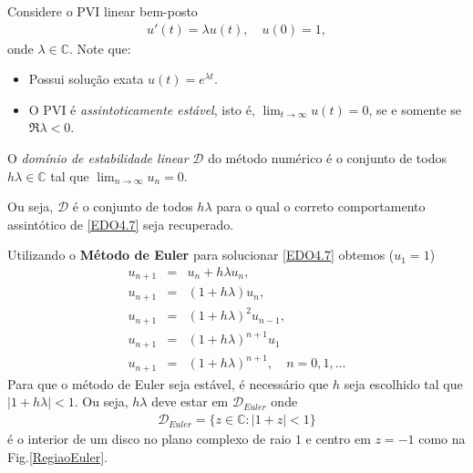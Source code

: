 Considere o PVI linear bem-posto
\begin{eqnarray}\label{EDO4.7}
  u'(t)= \lambda u(t), \quad  u(0)=1,
\end{eqnarray}
onde $\lambda  \in  \mathbb{C}$. Note que:
\begin{itemize}
\item Possui solução exata $u(t)=e^{\lambda t}.$
\item O PVI é \emph{assintoticamente estável}, isto é, $\lim_{t\rightarrow \infty }u(t)=0$, se e somente se $\Re{\lambda }<0$.
\
\end{itemize}




\begin{defn}
O \emph{domínio de estabilidade linear} $\mathcal D$ do método numérico é o conjunto de todos $h\lambda  \in  \mathbb{C}$ tal que $\lim_{n\rightarrow \infty }u_n=0$.
\end{defn}

Ou seja, $\mathcal D$ é o conjunto de todos $h\lambda $ para o qual o correto comportamento assintótico de \eqref{EDO4.7} seja recuperado.



\begin{ex}
Utilizando o \textbf{Método de Euler} para solucionar \eqref{EDO4.7} obtemos ($u_1=1$)
\begin{eqnarray}
 u_{n+1}   & =& u_n+h\lambda u_n, \\
 u_{n+1}   & =& (1+h\lambda )u_n, \\
 u_{n+1}   & =& (1+h\lambda )^2u_{n-1}, \\
 u_{n+1}   & =& (1+h\lambda )^{n+1}u_1 \\
 u_{n+1}   & =& (1+h\lambda )^{n+1}  , \quad  n=0,1,\ldots
\end{eqnarray}
Para que o método de Euler seja estável, é necessário que $h$ seja escolhido tal que $|1+h\lambda |<1$. Ou seja, $h\lambda $ deve estar em $\mathcal D_{Euler}$ onde
\begin{eqnarray}
 \mathcal D_{Euler} = \{z \in  \mathbb{C}: |1+z|<1\}
\end{eqnarray}
é o interior de um disco no plano complexo de raio $1$ e centro em $z=-1$ como na Fig.\ref{RegiaoEuler}.
\end{ex}


